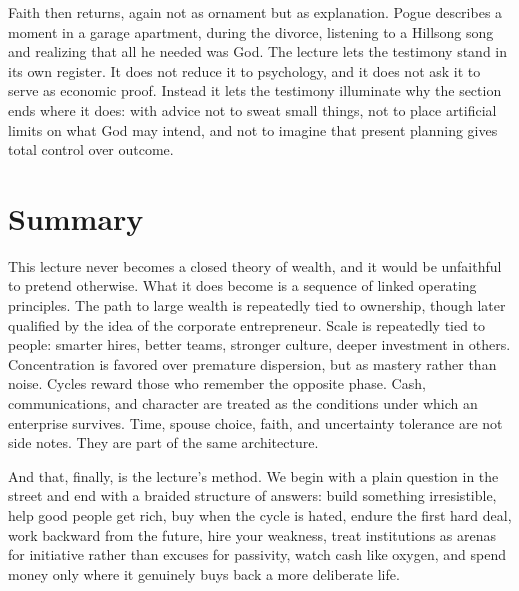 Faith then returns, again not as ornament but as explanation. Pogue describes a moment in a garage apartment, during the divorce, listening to a Hillsong song and realizing that all he needed was God. The lecture lets the testimony stand in its own register. It does not reduce it to psychology, and it does not ask it to serve as economic proof. Instead it lets the testimony illuminate why the section ends where it does: with advice not to sweat small things, not to place artificial limits on what God may intend, and not to imagine that present planning gives total control over outcome.

\section{Summary}

This lecture never becomes a closed theory of wealth, and it would be unfaithful to pretend otherwise. What it does become is a sequence of linked operating principles. The path to large wealth is repeatedly tied to ownership, though later qualified by the idea of the corporate entrepreneur. Scale is repeatedly tied to people: smarter hires, better teams, stronger culture, deeper investment in others. Concentration is favored over premature dispersion, but as mastery rather than noise. Cycles reward those who remember the opposite phase. Cash, communications, and character are treated as the conditions under which an enterprise survives. Time, spouse choice, faith, and uncertainty tolerance are not side notes. They are part of the same architecture.

And that, finally, is the lecture's method. We begin with a plain question in the street and end with a braided structure of answers: build something irresistible, help good people get rich, buy when the cycle is hated, endure the first hard deal, work backward from the future, hire your weakness, treat institutions as arenas for initiative rather than excuses for passivity, watch cash like oxygen, and spend money only where it genuinely buys back a more deliberate life.